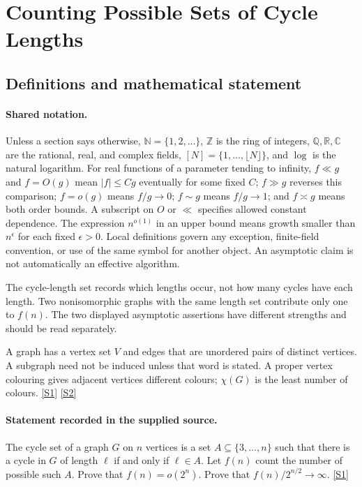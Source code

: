 \documentclass[11pt,a4paper]{article}
\newcommand{\N}{\mathbb{N}}
\newcommand{\Z}{\mathbb{Z}}
\newcommand{\Q}{\mathbb{Q}}
\newcommand{\R}{\mathbb{R}}
\newcommand{\C}{\mathbb{C}}
\newcommand{\sref}[2]{\hyperlink{source:#1:#2}{[S#2]}}
\begin{document}
\section{Counting Possible Sets of Cycle Lengths}\label{statement}


\subsection{Definitions and mathematical statement}

\paragraph{Shared notation.}Unless a section says otherwise, $\N=\{1,2,\ldots\}$,
$\Z$ is the ring of integers, $\Q,\R,\C$ are the rational, real, and complex
fields, $[N]=\{1,\ldots,\lfloor N\rfloor\}$, and $\log$ is the natural
logarithm. For real functions of a parameter tending to infinity,
$f\ll g$ and $f=O(g)$ mean $|f|\leq Cg$ eventually for some fixed $C$;
$f\gg g$ reverses this comparison; $f=o(g)$ means $f/g\to0$;
$f\sim g$ means $f/g\to1$; and $f\asymp g$ means both order bounds.
A subscript on $O$ or $\ll$ specifies allowed constant dependence.
The expression $n^{o(1)}$ in an upper bound means growth smaller than
$n^\epsilon$ for each fixed $\epsilon>0$. Local definitions govern any
exception, finite-field convention, or use of the same symbol for another
object. An asymptotic claim is not automatically an effective algorithm.



The cycle-length set records which lengths occur, not how many cycles have each length. Two nonisomorphic graphs with the same length set contribute only one to $f(n)$. The two displayed asymptotic assertions have different strengths and should be read separately.

A graph has a vertex set $V$ and edges that are unordered pairs of distinct vertices. A subgraph need not be induced unless that word is stated. A proper vertex colouring gives adjacent vertices different colours; $\chi(G)$ is the least number of colours. \sref{statement}{1} \sref{statement}{2}

\paragraph{Statement recorded in the supplied source.}
The cycle set of a graph $G$ on $n$ vertices is a set $A\subseteq \{3,\ldots,n\}$ such that there is a cycle in $G$ of length $\ell$ if and only if $\ell \in A$. Let $f(n)$ count the number of possible such $A$.
Prove that $f(n)=o(2^n)$.
Prove that $f(n)/2^{n/2}\to \infty$. \sref{statement}{1}
\end{document}
